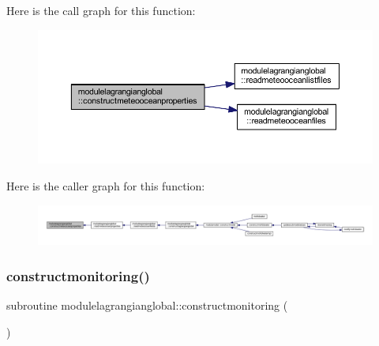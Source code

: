 Here is the call graph for this function\+:\nopagebreak
\begin{figure}[H]
\begin{center}
\leavevmode
\includegraphics[width=350pt]{namespacemodulelagrangianglobal_afb3b7fc4fe38ef436cb911bb192358f1_cgraph}
\end{center}
\end{figure}
Here is the caller graph for this function\+:\nopagebreak
\begin{figure}[H]
\begin{center}
\leavevmode
\includegraphics[width=350pt]{namespacemodulelagrangianglobal_afb3b7fc4fe38ef436cb911bb192358f1_icgraph}
\end{center}
\end{figure}
\mbox{\label{namespacemodulelagrangianglobal_ae93400b6f236b2e44a7b90febb2be220}} 
\subsubsection{\texorpdfstring{constructmonitoring()}{constructmonitoring()}}
{\footnotesize\ttfamily subroutine modulelagrangianglobal\+::constructmonitoring (\begin{DoxyParamCaption}{ }\end{DoxyParamCaption})\hspace{0.3cm}{\ttfamily [private]}}

